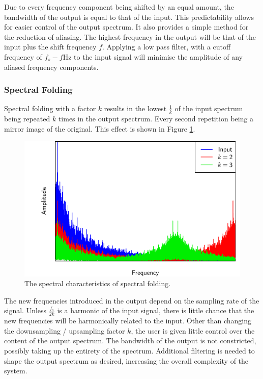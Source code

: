 			Due to every frequency component being shifted by an equal amount, the bandwidth of the output is
			equal to that of the input. This predictability allows for easier control of the output spectrum.
			It also provides a simple method for the reduction of aliasing. The highest frequency in the output
			will be that of the input plus the shift frequency $f$. Applying a low pass filter, with a cutoff
			frequency of $f_{s} - f$Hz to the input signal will minimise the amplitude of any aliased frequency
			components.

		\subsubsection*{Spectral Folding}
			Spectral folding with a factor $k$ results in the lowest $\frac{1}{k}$ of the input spectrum being
			repeated $k$ times in the output spectrum. Every second repetition being a mirror image of the
			original. This effect is shown in Figure \ref{fig:SpectralFolding}. 
			
			\begin{figure}[h!]
				\centering
				\includegraphics{chapter5/Images/SpectralFoldingSpectrum.pdf}
				\caption{The spectral characteristics of spectral folding.}
				\label{fig:SpectralFolding}
			\end{figure}

			The new frequencies introduced in the output depend on the sampling rate of the signal. Unless
			$\frac{f_{s}}{2k}$ is a harmonic of the input signal, there is little chance that the new
			frequencies will be harmonically related to the input. Other than changing the downsampling /
			upsampling factor $k$, the user is given little control over the content of the output spectrum.
			The bandwidth of the output is not constricted, possibly taking up the entirety of the spectrum.
			Additional filtering is needed to shape the output spectrum as desired, increasing the overall
			complexity of the system.

